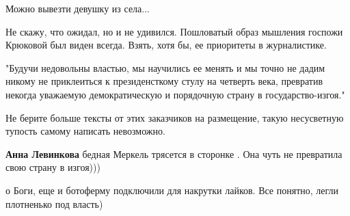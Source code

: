 \begin{itemize}
\begin{itemize}
 
Можно вывезти девушку из села...

 
Не скажу, что ожидал, но и не удивился. Пошловатый образ мышления госпожи Крюковой был виден всегда. Взять, хотя бы, ее приоритеты в журналистике.

\end{itemize}

 

"Будучи недовольны властью, мы научились ее менять и мы точно не дадим никому
не приклеиться к президенсткому стулу на четверть века, превратив некогда
уважаемую демократическую и порядочную страну в государство-изгоя."

Не берите больше тексты от этих заказчиков на размещение, такую несусветную
тупость самому написать невозможно.

\begin{itemize}
 
\textbf{Анна Левинкова} бедная Меркель трясется в сторонке . Она чуть не превратила свою страну в изгоя)))🤣

 
о Боги, еще и ботоферму подключили для накрутки лайков. Все понятно, легли плотненько под власть)

 

\end{itemize}
\end{itemize}
